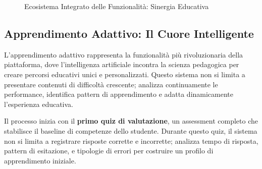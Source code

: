 \documentclass[a4paper, 14pt, oneside]{extbook}
\begin{document}
\begin{figure}[H]
\caption{Ecosistema Integrato delle Funzionalità: Sinergia Educativa}
\label{fig:feature-ecosystem}
\end{figure}

\subsection{Apprendimento Adattivo: Il Cuore Intelligente}

L'apprendimento adattivo rappresenta la funzionalità più rivoluzionaria della piattaforma, dove l'intelligenza artificiale incontra la scienza pedagogica per creare percorsi educativi unici e personalizzati. Questo sistema non si limita a presentare contenuti di difficoltà crescente; analizza continuamente le performance, identifica pattern di apprendimento e adatta dinamicamente l'esperienza educativa.

Il processo inizia con il \textbf{primo quiz di valutazione}, un assessment completo che stabilisce il baseline di competenze dello studente. Durante questo quiz, il sistema non si limita a registrare risposte corrette e incorrette; analizza tempo di risposta, pattern di esitazione, e tipologie di errori per costruire un profilo di apprendimento iniziale.
\end{document}
